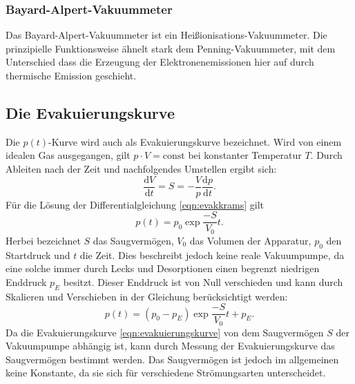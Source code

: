 \subsubsection*{Bayard-Alpert-Vakuummeter}
Das Bayard-Alpert-Vakuummeter ist ein Heißionisations-Vakuummeter. Die prinzipielle Funktionsweise ähnelt
stark dem Penning-Vakuummeter, mit dem Unterschied dass die Erzeugung der Elektronenemissionen hier auf durch
thermische Emission geschieht.

\subsection{Die Evakuierungskurve}
\label{subsec:evakutheorie}
Die $p(t)$-Kurve wird auch als Evakuierungskurve bezeichnet. Wird von einem idealen Gas ausgegangen,
gilt $p \cdot V = \text{const}$ bei konstanter Temperatur $T$. Durch Ableiten nach der Zeit und nachfolgendes Umstellen ergibt sich:
\begin{equation}
 \frac{\text{d}V}{\text{d}t} = S = - \frac{V}{p} \frac{\text{d}p}{\text{d}t}.
 \label{eqn:evakkrams}
\end{equation}
Für die Lösung der Differentialgleichung \ref{eqn:evakkrams} gilt
\begin{equation}
 p(t) = p_{0} \exp{\frac{-S}{V_{0}}t}.
\end{equation}
Herbei bezeichnet $S$ das Saugvermögen, $V_{0}$ das Volumen der Apparatur, $p_{0}$ den Startdruck und
$t$ die Zeit. Dies beschreibt jedoch keine reale Vakuumpumpe, da eine solche immer durch Lecks und Desorptionen
einen begrenzt niedrigen Enddruck $p_{E}$ besitzt. Dieser Enddruck ist von Null verschieden und kann durch Skalieren
und Verschieben in der Gleichung berücksichtigt werden:
\begin{equation}
 p(t) = (p_{0} - p_{E}) \exp{\frac{-S}{V_{0}}t} + p_{E}.
 \label{eqn:evakuierungskurve}
\end{equation}
Da die Evakuierungskurve \ref{eqn:evakuierungskurve} von dem Saugvermögen $S$ der Vakuumpumpe abhängig ist,
kann durch Messung der Evakuierungskurve das Saugvermögen bestimmt werden. Das Saugvermögen ist jedoch
im allgemeinen keine Konstante, da sie sich für verschiedene Strömungsarten unterscheidet.

